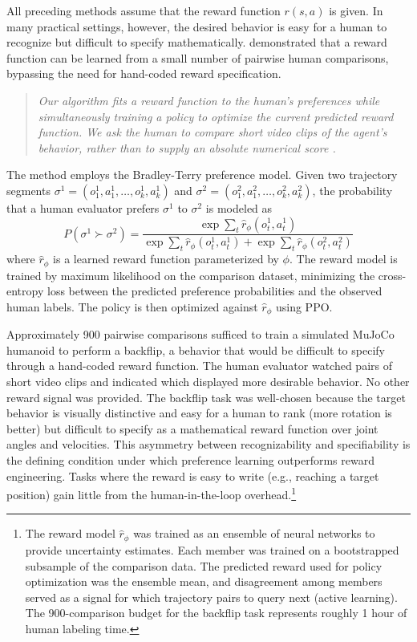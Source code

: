 All preceding methods assume that the reward function $r(s,a)$ is given. In many practical settings, however, the desired behavior is easy for a human to recognize but difficult to specify mathematically. \citet{Christiano2017} demonstrated that a reward function can be learned from a small number of pairwise human comparisons, bypassing the need for hand-coded reward specification.

\begin{quote}\itshape
Our algorithm fits a reward function to the human's preferences while simultaneously training a policy to optimize the current predicted reward function. We ask the human to compare short video clips of the agent's behavior, rather than to supply an absolute numerical score \citep{Christiano2017}.
\end{quote}

The method employs the Bradley-Terry preference model. Given two trajectory segments $\sigma^1 = (o_1^1, a_1^1, \ldots, o_k^1, a_k^1)$ and $\sigma^2 = (o_1^2, a_1^2, \ldots, o_k^2, a_k^2)$, the probability that a human evaluator prefers $\sigma^1$ to $\sigma^2$ is modeled as
\begin{equation}
P(\sigma^1 \succ \sigma^2) = \frac{\exp \sum_t \hat{r}_\phi(o_t^1, a_t^1)}{\exp \sum_t \hat{r}_\phi(o_t^1, a_t^1) + \exp \sum_t \hat{r}_\phi(o_t^2, a_t^2)}
\end{equation}
where $\hat{r}_\phi$ is a learned reward function parameterized by $\phi$. The reward model is trained by maximum likelihood on the comparison dataset, minimizing the cross-entropy loss between the predicted preference probabilities and the observed human labels. The policy is then optimized against $\hat{r}_\phi$ using PPO.

Approximately 900 pairwise comparisons sufficed to train a simulated MuJoCo humanoid to perform a backflip, a behavior that would be difficult to specify through a hand-coded reward function. The human evaluator watched pairs of short video clips and indicated which displayed more desirable behavior. No other reward signal was provided. The backflip task was well-chosen because the target behavior is visually distinctive and easy for a human to rank (more rotation is better) but difficult to specify as a mathematical reward function over joint angles and velocities. This asymmetry between recognizability and specifiability is the defining condition under which preference learning outperforms reward engineering. Tasks where the reward is easy to write (e.g., reaching a target position) gain little from the human-in-the-loop overhead.\footnote{The reward model $\hat{r}_\phi$ was trained as an ensemble of neural networks to provide uncertainty estimates. Each member was trained on a bootstrapped subsample of the comparison data. The predicted reward used for policy optimization was the ensemble mean, and disagreement among members served as a signal for which trajectory pairs to query next (active learning). The 900-comparison budget for the backflip task represents roughly 1 hour of human labeling time.}

